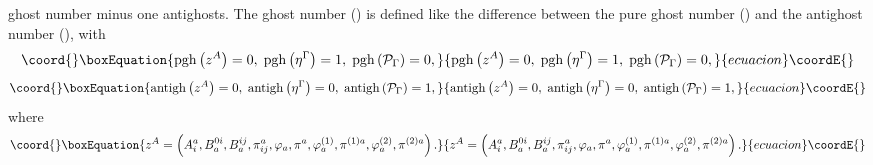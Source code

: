 \documentclass[a4paper,12pt]{article}
\begin{document}
ghost number minus one antighosts. The ghost number (\coordHE{}) is
defined like the difference between the pure ghost number (\coordHE{})
and the antighost number (\coordHE{}), with 
\begin{equation}\coord{}\boxEquation{
\mathrm{pgh}\left( z^{A}\right) =0,\;\mathrm{pgh}\left( \eta ^{\Gamma
}\right) =1,\;\mathrm{pgh}\left( \mathcal{P}_{\Gamma }\right) =0,
\label{17x}
}{
\mathrm{pgh}\left( z^{A}\right) =0,\;\mathrm{pgh}\left( \eta ^{\Gamma
}\right) =1,\;\mathrm{pgh}\left( \mathcal{P}_{\Gamma }\right) =0,
}{ecuacion}\coordE{}\end{equation}
\begin{equation}\coord{}\boxEquation{
\mathrm{antigh}\left( z^{A}\right) =0,\;\mathrm{antigh}\left( \eta ^{\Gamma
}\right) =0,\;\mathrm{antigh}\left( \mathcal{P}_{\Gamma }\right) =1,
\label{18x}
}{
\mathrm{antigh}\left( z^{A}\right) =0,\;\mathrm{antigh}\left( \eta ^{\Gamma
}\right) =0,\;\mathrm{antigh}\left( \mathcal{P}_{\Gamma }\right) =1,
}{ecuacion}\coordE{}\end{equation}
where 
\begin{equation}\coord{}\boxEquation{
z^{A}=\left( A_{i}^{a},B_{a}^{0i},B_{a}^{ij},\pi _{ij}^{a},\varphi _{a},\pi
^{a},\varphi _{a}^{\left( 1\right) },\pi ^{(1)a},\varphi _{a}^{\left(
2\right) },\pi ^{(2)a}\right) .  \label{19x}
}{
z^{A}=\left( A_{i}^{a},B_{a}^{0i},B_{a}^{ij},\pi _{ij}^{a},\varphi _{a},\pi
^{a},\varphi _{a}^{\left( 1\right) },\pi ^{(1)a},\varphi _{a}^{\left(
2\right) },\pi ^{(2)a}\right) .  }{ecuacion}\coordE{}\end{equation}
\end{document}
